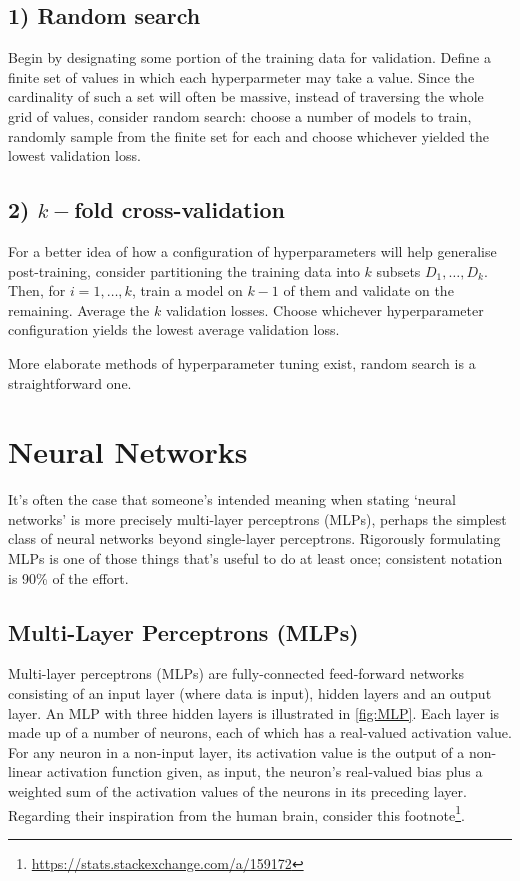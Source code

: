 \documentclass[11pt]{article}
\begin{document}
\subsection*{1) Random search}
Begin by designating some portion of the training data for validation. Define a finite set of values in which each hyperparmeter may take a value. Since the cardinality of such a set will often be massive, instead of traversing the whole grid of values, consider random search: choose a number of models to train, randomly sample from the finite set for each and choose whichever yielded the lowest validation loss.

\subsection*{2) $k-$fold cross-validation}
For a better idea of how a configuration of hyperparameters will help generalise post-training, consider partitioning the training data into $k$ subsets $D_1,\dots,D_k$. Then, for $i=1,\dots,k$, train a model on $k-1$ of them and validate on the remaining. Average the $k$ validation losses. Choose whichever hyperparameter configuration yields the lowest average validation loss.

More elaborate methods of hyperparameter tuning exist, random search is a straightforward one.


\section{Neural Networks}
It's often the case that someone's intended meaning when stating `neural networks' is more precisely multi-layer perceptrons (MLPs), perhaps the simplest class of neural networks beyond single-layer perceptrons. Rigorously formulating MLPs is one of those things that's useful to do at least once; consistent notation is 90\% of the effort.

\subsection{Multi-Layer Perceptrons (MLPs)}
\label{sec:multi_layer_perceptrons}

Multi-layer perceptrons (MLPs) are fully-connected feed-forward networks consisting of an input layer (where data is input), hidden layers and an output layer. An MLP with three hidden layers is illustrated in \autoref{fig:MLP}. Each layer is made up of a number of neurons, each of which has a real-valued activation value.  For any neuron in a non-input layer, its activation value is the output of a non-linear activation function given, as input, the neuron's real-valued bias plus a weighted sum of the activation values of the neurons in its preceding layer. Regarding their inspiration from the human brain, consider this footnote\footnote{\url{https://stats.stackexchange.com/a/159172}}.
\end{document}
